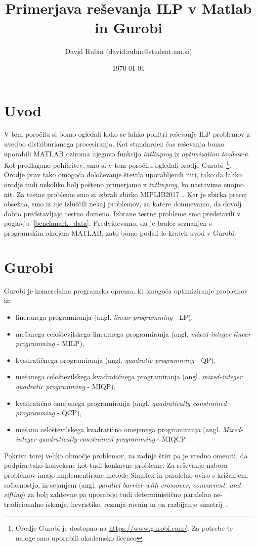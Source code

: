\documentclass[a4paper,11pt]{article}
\title{Primerjava reševanja ILP v Matlab in Gurobi}
\author{David Rubin (david.rubin@student.um.si)}
\date{\today}
\begin{document}
\maketitle

\section{Uvod}

V tem poročilu si bomo ogledali kako se lahko pohitri reševanje ILP problemov z uvedbo distriburianega procesiranja. Kot standarden čas reševanja bomo uporabili MATLAB oziroma njegovo funkcijo \textit{intlinprog} iz \textit{optimization toolbox-a}.  Kot predlagano pohitritev, smo si v tem poročilu ogledali orodje Gurobi~\footnote{Orodje Gurobi je dostopno na \url{https://www.gurobi.com/}. Za potrebe te naloge smo uporabili akademsko licenco}. Orodje prav tako omogoča določevanje števila uporabljenih niti, tako da lahko orodje tudi nekoliko bolj pošteno primerjamo z \textit{intlinprog}, ko nastavimo enojno nit. Za testne probleme smo si izbrali zbirko MIPLIB2017~\cite{Miplib:2017}. Ker je zbirka precej obsežna, smo iz nje izluščili nekaj problemov, za katere domnevamo, da dovolj dobro predstavljajo testno domeno. Izbrane testne probleme smo predstavili v poglavju~\ref{benchmark_data}. Predvidevamo, da je bralec seznanjen s programskim okoljem MATLAB, zato bomo podali le kratek uvod v Gurobi.

\section{Gurobi}

Gurobi je komercialna programska oprema, ki omogoča optimiziranje problemov iz:
\begin{itemize}
\item lineranega programiranja (angl. \textit{linear programming} - LP),
\item mešanega celoštevilskega linearnega programiranja (angl. \textit{mixed-integer linear programming} - MILP),
\item kvadratičnega programiranja (angl. \textit{quadratic programming} - QP),
\item mešanega  celoštevilskega kvadratičnega programiranja (angl. \textit{mixed-integer quadratic programming} - MIQP),
\item kvadratično omejenega programiranja (angl. \textit{quadratically constrained programming} - QCP),
\item mešano celoštevilskega kvadratično omejenega programiranja (angl. \textit{Mixed-integer quadratically-constrained programming} - MIQCP.
\end{itemize}
Pokriva torej veliko območje problemov, za zadnje štiri pa je vredno omeniti, da podpira tako konveksne kot tudi konkavne probleme. Za reševanje nabora problemov imajo implementirane metode Simplex in paralelno oviro s križanjem, sočasnostjo, in sejanjem (angl. \textit{parallel barrier with crossover, concurrent, and sifting}) za bolj zahtevne pa uporabijo tudi deterministično paralelno ne-tradicionalno iskanje, hevristike, rezanja ravnin in pa razbijanje simetrij~\cite{GurobiOptimizer:2020}. 	
\end{document}
